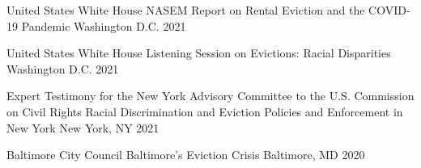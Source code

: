 


\begin{cventries}

  \cventry
    {United States White House} %
    {NASEM Report on Rental Eviction and the COVID-19 Pandemic} %
    {Washington D.C.} %
    {2021} %
    {}

  \cventry
    {United States White House} %
    {Listening Session on Evictions: Racial Disparities} %
    {Washington D.C.} %
    {2021} %
    {}

  \cventry
    {Expert Testimony for the New York Advisory Committee to the U.S. Commission on Civil Rights} %
    {Racial Discrimination and Eviction Policies and Enforcement in New York} %
    {New York, NY} %
    {2021} %
    {}



  \cventry
    {Baltimore City Council} %
    {Baltimore's Eviction Crisis} %
    {Baltimore, MD} %
    {2020} %
    {}


\end{cventries}
